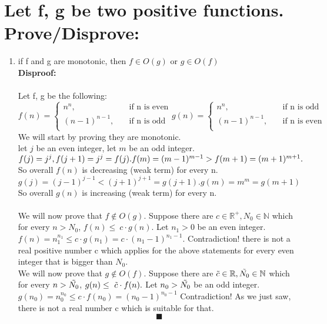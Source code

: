 \documentclass{article}
\begin{document}
\section{Let f, g be two positive functions. Prove/Disprove:}
\begin{enumerate}
    \item if f and g are monotonic, then $f\in{}O(g)$ or $g\in{}O(f)$\\
    \textbf{Disproof:}\\\\
    Let f, g be the following:\\
    \[
    f(n)=
        \begin{cases}
            \text{$n^{n},$} &\quad\text{if n is even}\\
            \text{$(n-1)^{n-1}, $} &\quad\text{if n is odd}\\
        \end{cases}
    g(n)=
        \begin{cases}
            \text{$n^{n},$} &\quad\text{if n is odd}\\
            \text{$(n-1)^{n-1}, $} &\quad\text{if n is even}\\
        \end{cases}
    \]
    We will start by proving they are monotonic.\\
    let $j$ be an even integer, let $m$ be an odd integer.\\
    $f(j)=j^j, f(j+1)=j^{j}=f(j).\\
    f(m)=(m-1)^{m-1}>f(m+1)=(m+1)^{m+1}.$
    So overall $f(n)$ is decreasing (weak term) for every n.\\
    $g(j)=(j-1)^{j-1}<(j+1)^{j+1}=g(j+1).
    g(m)=m^m=g(m+1)$ So overall  $g(n)$ is increasing (weak term) for every n.\\\\
    We will now prove that $f\notin{}O(g)$. Suppose there are $c\in\mathbb{R}^{+}, N_0\in\mathbb{N}$ which for every $n>N_0$, $f(n)\le\ c\cdot g(n).$ Let $n_1>0$ be an even integer. $f(n)=n_1^{n_1}\le c\cdot g(n_1)=c\cdot(n_1-1)^{n_1-1}.$ 
    Contradiction! there is not a real positive number c which applies for the above statements for every even integer that is bigger than $N_0$.\\
    We will now prove that $g\notin{}O(f)$. Suppose there are $\Tilde{c}\in\mathbb{R}, \Tilde{N_0}\in\mathbb{N}$ which for every $n>\Tilde{N_0}$, $g(n)\le\ \Tilde{c}\cdot f(n).$ Let $n_0>\Tilde{N_0}$ be an odd integer. $g(n_0)=n_0^{n_0}\le c\cdot f(n_0) = (n_0-1)^{n_0-1}$ Contradiction! As we just saw, there is not a real number c which is suitable for that.
    $$\blacksquare$$\\


\end{enumerate}
\end{document}
